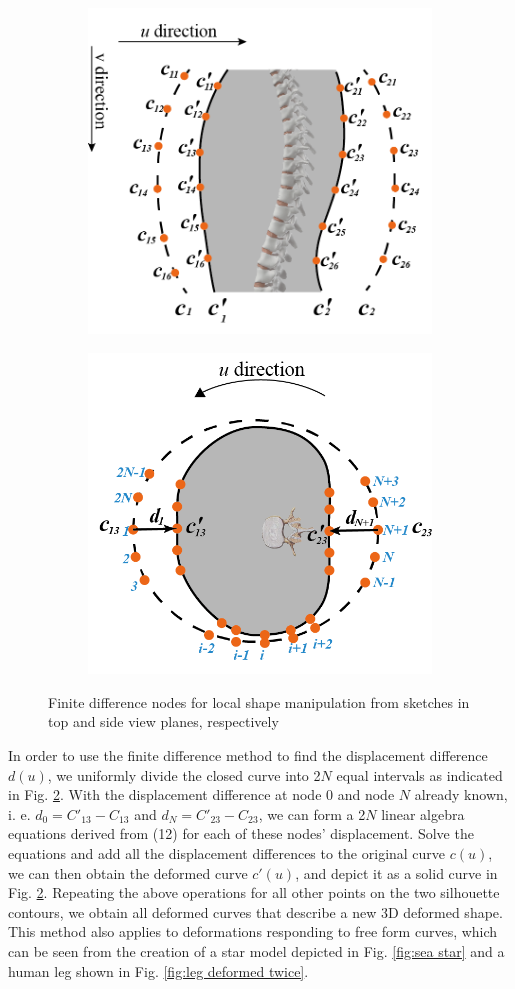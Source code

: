 \documentclass[runningheads]{llncs}
\begin{document}
\begin{figure}[!htbp]
    \centering
    \begin{subfigure}[b]{.45\columnwidth}
    \includegraphics[height=2 in]{fdmnode_a.png}
    \caption{}
    \label{fig:finite node side view}
    \end{subfigure}
    \hspace{2em}
    \begin{subfigure}[b]{.45\columnwidth}
    \includegraphics[height=2 in]{fdmnode_b.png}
    \caption{}
    \label{fig:finite node top view}
    \end{subfigure}
    \caption{Finite difference nodes for local shape manipulation from sketches in top and side view planes, respectively}
    \label{fig:different means to input silhouette}
\end{figure}

In order to use the finite difference method to find the displacement difference $d(u)$, we uniformly divide the closed curve into 2$N$ equal intervals as indicated in Fig. \ref{fig:finite node top view}. With the displacement difference at node 0 and node $N$ already known, i. e. $d_{0}=C'_{13}-C_{13}$ and $d_{N}=C'_{23}-C_{23}$, we can form a 2$N$ linear algebra equations derived from (12) for each of these nodes’ displacement. Solve the equations and add all the displacement differences to the original curve $c(u)$, we can then obtain the deformed curve $c'(u)$, and depict it as a solid curve in Fig. \ref{fig:finite node top view}. Repeating the above operations for all other points on the two silhouette contours, we obtain all deformed curves that describe a new 3D deformed shape. This method also applies to deformations responding to free form curves, which can be seen from the creation of a star model depicted in Fig. \ref{fig:sea star} and a human leg shown in Fig. \ref{fig:leg deformed twice}.
\end{document}
